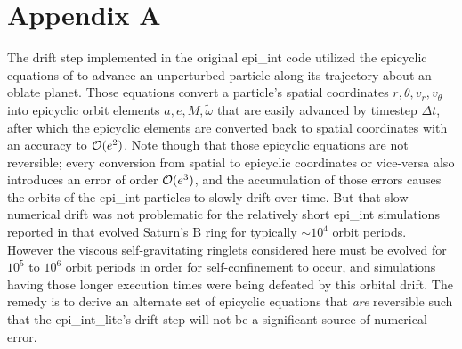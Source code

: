 \documentclass[preprint]{aastex62}
\begin{document}
\appendix

\section{Appendix A}
\label{sec:Appendix A}

The drift step implemented in the original epi\_int code utilized the epicyclic equations of \cite{BL94}
to advance an unperturbed particle along its trajectory about an oblate planet. Those equations
convert a particle's spatial coordinates $r, \theta, v_r, v_\theta$
into epicyclic orbit elements $a,e,M,\tilde{\omega}$ that are easily advanced by timestep
$\Delta t$, after which the epicyclic elements are converted back to spatial coordinates
with an accuracy to ${\cal O}(e^2)$. Note though that those epicyclic equations are not reversible;
every conversion from spatial to epicyclic coordinates or vice-versa also introduces an 
error of order ${\cal O}(e^3)$, and the accumulation of those errors causes the orbits of the epi\_int particles to 
slowly drift over time.  But that slow numerical drift
was not problematic for the relatively short epi\_int simulations reported in \cite{HS13} that evolved
Saturn's B ring for typically $\sim10^4$ orbit periods. However the viscous self-gravitating
ringlets considered here must be evolved for $10^5$ to $10^6$ orbit periods in order for self-confinement to occur,
and simulations having those longer execution times were being defeated by this orbital drift. 
The remedy is to derive an alternate set of epicyclic equations that
{\em are} reversible such that the epi\_int\_lite's drift step will not be a significant
source of numerical error.
\end{document}
